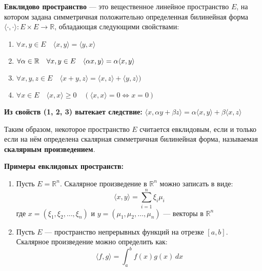 \begin{shdef}
    \begin{definition}
        \leavevmode\newline
        
        \textbf{Евклидово пространство} — это вещественное линейное пространство $E$, на котором задана симметричная положительно определенная билинейная форма $\langle \cdot, \cdot \rangle: E \times E \to \mathbb{R}$, обладающая следующими свойствами:
        \begin{enumerate}
            \item $\forall x, y \in E \quad \langle x, y \rangle = \langle y, x \rangle$
            \item $\forall \alpha \in \mathbb{R} \quad \forall x, y \in E \quad \langle \alpha x, y \rangle = \alpha \langle x, y \rangle$
            \item $\forall x, y, z \in E \quad \langle x + y,z \rangle = \langle x,z \rangle + \langle y,z \rangle)$
            \item $\forall x \in E \quad \langle x, x \rangle \geq 0 \quad (\langle x,x \rangle = 0 \Longleftrightarrow x = 0)$
        \end{enumerate}
        \vspace{0.3cm}
        \textbf{Из свойств (1, 2, 3) вытекает следствие:} $\langle x, \alpha y + \beta z \rangle = \alpha \langle x,y \rangle + \beta \langle x,z \rangle$
    \end{definition}
\end{shdef}
\vspace{2.0cm}
Таким образом, некоторое пространство $E$ считается евклидовым, если и только если на нём определена скалярная симметричная билинейная форма, называемая \textbf{скалярным произведением}.

\clearpage
\textbf{Примеры евклидовых пространств:}
\begin{shex}
    \begin{enumerate}
        \item
        Пусть $E = \mathbb{R}^n$.
        Скалярное произведение в $\mathbb{R}^n$ можно записать в виде:
        \[
        \langle x, y \rangle = \sum_{i=1}^n \xi_i \mu_i
        \]
        где $x = (\xi_1, \xi_2, \ldots, \xi_n)$ и $y = (\mu_1, \mu_2, \ldots, \mu_n)$ — векторы в $\mathbb{R}^n$
        
        \clearpage
        \item
        Пусть $E$ — пространство непрерывных функций на отрезке $[a, b]$.
        \newline 
        Скалярное произведение можно определить как:
        \[
        \langle f, g \rangle = \int_a^b f(x) g(x) \, dx
        \]
        
    \end{enumerate}
\end{shex}


